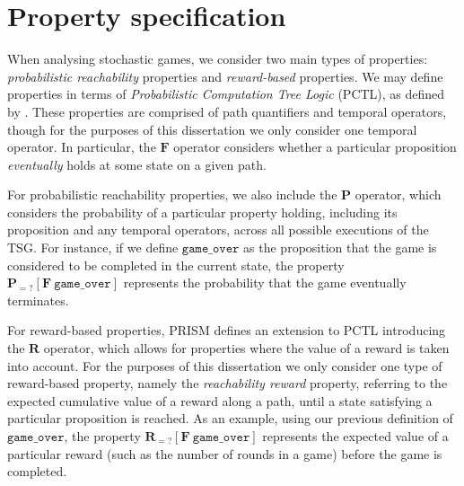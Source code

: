 \section{Property specification}

When analysing stochastic games, we consider two main types of properties: \emph{probabilistic reachability} properties and \emph{reward-based} properties. We may define properties in terms of \emph{Probabilistic Computation Tree Logic} (PCTL), as defined by \cite{hansson_logic_1994}. These properties are comprised of path quantifiers and temporal operators, though for the purposes of this dissertation we only consider one temporal operator. In particular, the $\mathbf{F}$ operator considers whether a particular proposition \emph{eventually} holds at some state on a given path.

For probabilistic reachability properties, we also include the $\mathbf{P}$ operator, which considers the probability of a particular property holding, including its proposition and any temporal operators, across all possible executions of the TSG. For instance, if we define $\mathtt{game\_over}$ as the proposition that the game is considered to be completed in the current state, the property $\mathbf{P}_{=?} [\mathbf{F}\ \mathtt{game\_over}]$ represents the probability that the game eventually terminates.

For reward-based properties, PRISM defines an extension to PCTL introducing the $\mathbf{R}$ operator, which allows for properties where the value of a reward is taken into account. For the purposes of this dissertation we only consider one type of reward-based property, namely the \emph{reachability reward} property, referring to the expected cumulative value of a reward along a path, until a state satisfying a particular proposition is reached. As an example, using our previous definition of $\mathtt{game\_over}$, the property $\mathbf{R}_{=?} [\mathbf{F}\ \mathtt{game\_over}]$ represents the expected value of a particular reward (such as the number of rounds in a game) before the game is completed.